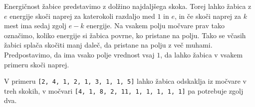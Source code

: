 \documentclass[arhiv]{../izpit}
\begin{document}
Energičnost žabice predstavimo z dolžino najdaljšega skoka. Torej lahko žabica z $e$ energije skoči naprej za katerokoli razdaljo med $1$ in $e$, in če skoči naprej za $k$ mest ima sedaj zgolj $e - k$ energije. Na vsakem polju močvare prav tako označimo, koliko energije si žabica povrne, ko pristane na polju. Tako se včasih žabici splača skočiti manj daleč, da pristane na polju z več muhami. Predpostavimo, da ima vsako polje vrednost vsaj $1$, da lahko žabica v vsakem primeru skoči naprej.

V primeru \verb|[2, 4, 1, 2, 1, 3, 1, 1, 5]| lahko žabica odskaklja iz močvare v treh skokih, v močvari \verb|[4, 1, 8, 2, 11, 1, 1, 1, 1, 1]| pa potrebuje zgolj dva.
\end{document}
